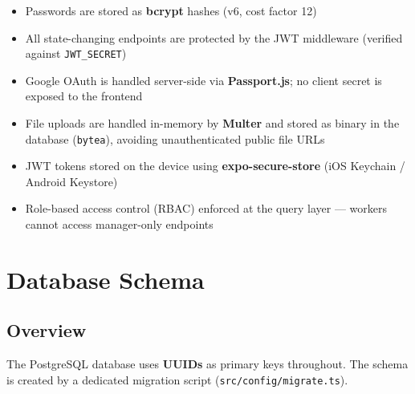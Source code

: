 \documentclass[12pt,a4paper]{article}
\begin{document}
\begin{itemize}[noitemsep]
    \item Passwords are stored as \textbf{bcrypt} hashes (v6, cost factor 12)
    \item All state-changing endpoints are protected by the JWT middleware (verified against \texttt{JWT\_SECRET})
    \item Google OAuth is handled server-side via \textbf{Passport.js}; no client secret is exposed to the frontend
    \item File uploads are handled in-memory by \textbf{Multer} and stored as binary in the database (\texttt{bytea}), avoiding unauthenticated public file URLs
    \item JWT tokens stored on the device using \textbf{expo-secure-store} (iOS Keychain / Android Keystore)
    \item Role-based access control (RBAC) enforced at the query layer --- workers cannot access manager-only endpoints
\end{itemize}

\section{Database Schema}

\subsection{Overview}

The PostgreSQL database uses \textbf{UUIDs} as primary keys throughout. The schema is created by a dedicated migration script (\texttt{src/config/migrate.ts}).
\end{document}

